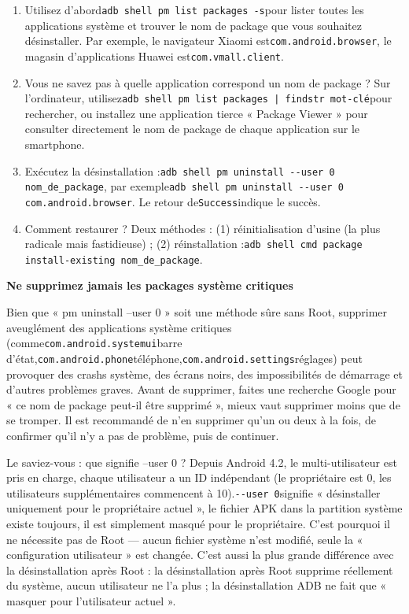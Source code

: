 \begin{enumerate}
  \item Utilisez d'abord\texttt{adb shell pm list packages -\allowbreak s}pour lister toutes les applications système et trouver le nom de package que vous souhaitez désinstaller. Par exemple, le navigateur Xiaomi est\texttt{com.\allowbreak android.\allowbreak browser}, le magasin d'applications Huawei est\texttt{com.\allowbreak vmall.\allowbreak client}.
  \item Vous ne savez pas à quelle application correspond un nom de package ? Sur l'ordinateur, utilisez\texttt{adb shell pm list packages | findstr mot-\allowbreak clé}pour rechercher, ou installez une application tierce « Package Viewer » pour consulter directement le nom de package de chaque application sur le smartphone.
  \item Exécutez la désinstallation :\texttt{adb shell pm uninstall -\allowbreak -\allowbreak user 0 nom\_de\_package}, par exemple\texttt{adb shell pm uninstall -\allowbreak -\allowbreak user 0 com.\allowbreak android.\allowbreak browser}. Le retour de\texttt{Success}indique le succès.
  \item Comment restaurer ? Deux méthodes : (1) réinitialisation d'usine (la plus radicale mais fastidieuse) ; (2) réinstallation :\texttt{adb shell cmd package install-\allowbreak existing nom\_de\_package}.
\end{enumerate}

\textbf{Ne supprimez jamais les packages système critiques}\par

Bien que « pm uninstall --user 0 » soit une méthode sûre sans Root, supprimer aveuglément des applications système critiques (comme\texttt{com.\allowbreak android.\allowbreak systemui}barre d'état,\texttt{com.\allowbreak android.\allowbreak phone}téléphone,\texttt{com.\allowbreak android.\allowbreak settings}réglages) peut provoquer des crashs système, des écrans noirs, des impossibilités de démarrage et d'autres problèmes graves. Avant de supprimer, faites une recherche Google pour « ce nom de package peut-il être supprimé », mieux vaut supprimer moins que de se tromper. Il est recommandé de n'en supprimer qu'un ou deux à la fois, de confirmer qu'il n'y a pas de problème, puis de continuer.

\begin{tcbinfo}{Le saviez-vous : que signifie --user 0 ?}
Depuis Android 4.2, le multi-utilisateur est pris en charge, chaque utilisateur a un ID indépendant (le propriétaire est 0, les utilisateurs supplémentaires commencent à 10).\texttt{-\allowbreak -\allowbreak user 0}signifie « désinstaller uniquement pour le propriétaire actuel », le fichier APK dans la partition système existe toujours, il est simplement masqué pour le propriétaire. C'est pourquoi il ne nécessite pas de Root — aucun fichier système n'est modifié, seule la « configuration utilisateur » est changée. C'est aussi la plus grande différence avec la désinstallation après Root : la désinstallation après Root supprime réellement du système, aucun utilisateur ne l'a plus ; la désinstallation ADB ne fait que « masquer pour l'utilisateur actuel ».

\end{tcbinfo}

